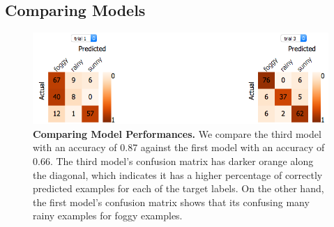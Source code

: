 \subsection{Comparing Models}
\begin{figure}[!htbp]
\centering
\includegraphics[width=1\textwidth]{ConfusionMatrixCompare}
\caption{\textbf{Comparing Model Performances.} We compare the third model with an accuracy of 0.87 against the first model with an accuracy of 0.66. The third model's confusion matrix has darker orange along the diagonal, which indicates it has a higher percentage of correctly predicted examples for each of the target labels. On the other hand, the first model's confusion matrix shows that its confusing many rainy examples for foggy examples. } \label{fig:ConfusionMatrixCompare}
\end{figure}

